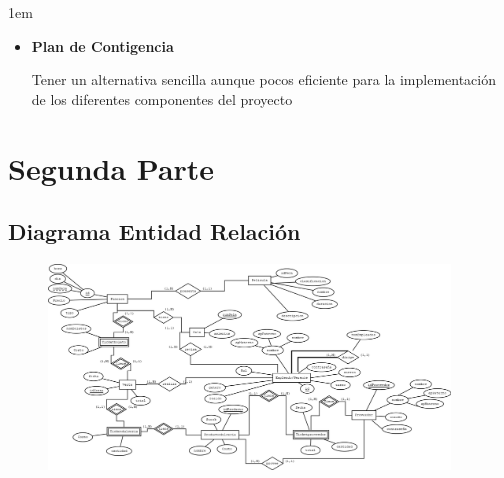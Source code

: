 \documentclass[12pt, fleqn]{report}                             %
\newenvironment{SmallIndentation}[1][0.75em]                    %
    {\begin{adjustwidth}{#1}{}\begin{footnotesize}}                 %
    {\end{footnotesize}\end{adjustwidth}}                           %
\begin{document}
\begin{SmallIndentation}[1em]
\begin{itemize}
                        \item
                            \textbf{Plan de Contigencia}

                                Tener un alternativa sencilla aunque pocos 
                                eficiente para la implementación de los 
                                diferentes componentes del proyecto

                    \end{itemize}
                
                \end{SmallIndentation}
                    



\chapter{Segunda Parte}
\clearpage

    \clearpage
    \section{Diagrama Entidad Relación}
        \begin{figure}[h]
            \centering
            \includegraphics[width=0.95\textwidth]{DiagramaEntidadRelacion.png}
        \end{figure}

        
\end{document}
